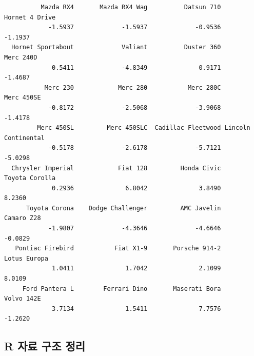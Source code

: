 \documentclass[11pt,a4paper]{book}
\theoremstyle{definition}
\theoremstyle{definition}
\theoremstyle{definition}
\theoremstyle{remark}
\begin{document}
\begin{verbatim}
          Mazda RX4       Mazda RX4 Wag          Datsun 710      Hornet 4 Drive 
            -1.5937             -1.5937             -0.9536             -1.1937 
  Hornet Sportabout             Valiant          Duster 360           Merc 240D 
             0.5411             -4.8349              0.9171             -1.4687 
           Merc 230            Merc 280           Merc 280C          Merc 450SE 
            -0.8172             -2.5068             -3.9068             -1.4178 
         Merc 450SL         Merc 450SLC  Cadillac Fleetwood Lincoln Continental 
            -0.5178             -2.6178             -5.7121             -5.0298 
  Chrysler Imperial            Fiat 128         Honda Civic      Toyota Corolla 
             0.2936              6.8042              3.8490              8.2360 
      Toyota Corona    Dodge Challenger         AMC Javelin          Camaro Z28 
            -1.9807             -4.3646             -4.6646             -0.0829 
   Pontiac Firebird           Fiat X1-9       Porsche 914-2        Lotus Europa 
             1.0411              1.7042              2.1099              8.0109 
     Ford Pantera L        Ferrari Dino       Maserati Bora          Volvo 142E 
             3.7134              1.5411              7.7576             -1.2620 
\end{verbatim}

\normalsize

\subsection{R 자료 구조 정리}\label{r---}
\end{document}
